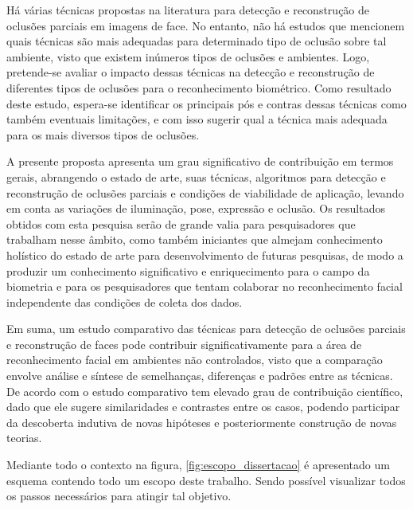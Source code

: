 Há várias técnicas propostas na literatura para detecção e reconstrução de oclusões parciais em imagens de face. No entanto, não há estudos que mencionem quais técnicas são mais adequadas para determinado tipo de oclusão sobre tal ambiente, visto que existem inúmeros tipos de oclusões e ambientes. Logo, pretende-se avaliar o impacto dessas técnicas na detecção e reconstrução de diferentes tipos de oclusões para o reconhecimento biométrico. Como resultado deste estudo, espera-se identificar os principais pós e contras dessas técnicas como também eventuais limitações, e com isso sugerir qual a técnica mais adequada para os mais diversos tipos de oclusões.

A presente proposta apresenta um grau significativo de contribuição em termos gerais, abrangendo o estado de arte, suas técnicas, algoritmos para detecção e reconstrução de oclusões parciais e condições de viabilidade de aplicação, levando em conta as variações de iluminação, pose, expressão e oclusão. Os resultados obtidos com esta pesquisa serão de grande valia para pesquisadores que trabalham nesse âmbito, como também iniciantes que almejam conhecimento holístico do estado de arte para desenvolvimento de futuras pesquisas, de modo a produzir um conhecimento significativo e enriquecimento para o campo da biometria e para os pesquisadores que tentam colaborar no reconhecimento facial independente das condições de coleta dos dados.

Em suma, um estudo comparativo das técnicas para detecção de oclusões parciais e reconstrução de faces pode contribuir significativamente para a área de reconhecimento facial em ambientes não controlados, visto que a comparação envolve análise e síntese de semelhanças, diferenças e padrões entre as técnicas. De acordo com  o estudo comparativo tem elevado grau de contribuição científico, dado que ele sugere similaridades e contrastes entre os casos, podendo participar da descoberta indutiva de novas hipóteses e posteriormente construção de novas teorias.  

Mediante todo o contexto na figura, \ref{fig:escopo_dissertacao} é apresentado um esquema contendo todo um escopo deste trabalho. Sendo possível visualizar todos os passos necessários para atingir tal objetivo. 

